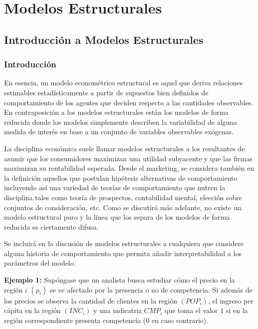 \documentclass[
]{book}
\begin{document}
\chapter{Modelos Estructurales}\label{modelos-estructurales}

\section{Introducción a Modelos Estructurales}\label{introducciuxf3n-a-modelos-estructurales}

\subsection{Introducción}\label{introducciuxf3n-1}

En esencia, un modelo econométrico estructural es aquel que deriva relaciones estimables estadísticamente a partir de supuestos bien definidos de comportamiento de los agentes que deciden respecto a las cantidades observables. En contraposición a los modelos estructurales están los modelos de forma reducida donde los modelos simplemente describen la variabilidad de alguna medida de interés en base a un conjunto de variables observables exógenas.

La disciplina económica suele llamar modelos estructurales a los resultantes de asumir que los consumidores maximizan una utilidad subyacente y que las firmas maximizan su rentabilidad esperada. Desde el marketing, se considera también en la definición aquellos que postulan hipótesis alternativas de comportamiento incluyendo así una variedad de teorías de comportamiento que nutren la disciplina tales como teoría de prospectos, contabilidad mental, elección sobre conjuntos de consideración, etc. Como se discutirá más adelante, no existe un modelo estructural puro y la línea que los separa de los modelos de forma reducida es ciertamente difusa.

Se incluirá en la discusión de modelos estructurales a cualquiera que considere alguna historia de comportamiento que permita añadir interpretabilidad a los parámetros del modelo.

\textbf{Ejemplo 1:} Supóngase que un analista busca estudiar cómo el precio en la región \(i\) \((p_i)\) se ve afectado por la presencia o no de competencia. Si además de los precios se observa la cantidad de clientes en la región \((POP_i)\), el ingreso per cápita en la región \((INC_i)\) y una indicatriz \(CMP_i\) que toma el valor 1 si en la región correspondiente presenta competencia (0 en caso contrario).
\end{document}
